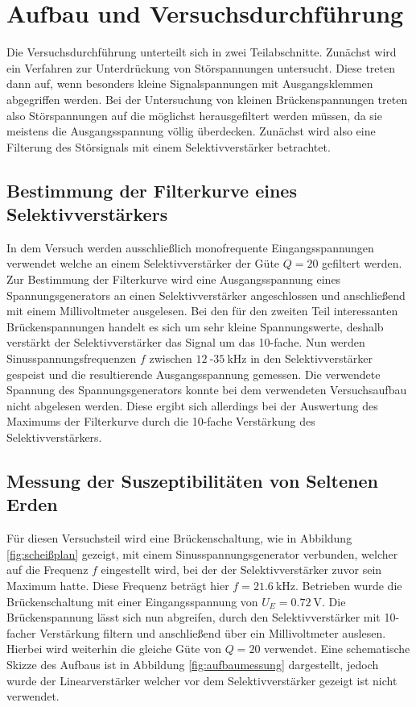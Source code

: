 \section{Aufbau und Versuchsdurchführung}

Die Versuchsdurchführung unterteilt sich in zwei Teilabschnitte. Zunächst wird ein Verfahren zur Unterdrückung von Störspannungen untersucht. Diese treten dann auf, wenn besonders kleine Signalspannungen mit Ausgangsklemmen abgegriffen werden.
Bei der Untersuchung von kleinen Brückenspannungen treten also Störspannungen auf die möglichst herausgefiltert werden müssen, da sie meistens die Ausgangsspannung völlig überdecken. Zunächst wird also eine Filterung des Störsignals mit
einem Selektivverstärker betrachtet.

\subsection{Bestimmung der Filterkurve eines Selektivverstärkers}
In dem Versuch werden ausschließlich monofrequente Eingangsspannungen verwendet welche an einem Selektivverstärker der Güte $Q = 20$ gefiltert werden. Zur Bestimmung der Filterkurve wird eine Ausgangsspannung eines Spannungsgenerators 
an einen Selektivverstärker angeschlossen und anschließend mit einem Millivoltmeter ausgelesen. 
Bei den für den zweiten Teil interessanten Brückenspannungen handelt es sich um sehr kleine Spannungswerte, deshalb verstärkt der Selektivverstärker das Signal um das 10-fache.
Nun werden Sinusspannungsfrequenzen $f$ zwischen $\SI{12}{}$-$\SI{35}{\kilo\hertz}$ in den Selektivverstärker gespeist und die resultierende Ausgangsspannung gemessen.
Die verwendete Spannung des Spannungsgenerators konnte bei dem verwendeten Versuchsaufbau nicht abgelesen werden. Diese ergibt sich allerdings bei der Auswertung des Maximums der Filterkurve durch die 10-fache Verstärkung des Selektivverstärkers.

\subsection{Messung der Suszeptibilitäten von Seltenen Erden} 
Für diesen Versuchsteil wird eine Brückenschaltung, wie in Abbildung \ref{fig:scheißplan} gezeigt, mit einem Sinusspannungsgenerator verbunden, welcher auf die Frequenz $f$ eingestellt wird, bei der der Selektivverstärker zuvor sein Maximum hatte. Diese Frequenz beträgt hier $f = \SI{21.6}{\kilo\hertz}$.
Betrieben wurde die Brückenschaltung mit einer Eingangsspannung von $U_{E} = \SI{0.72}{\volt}$. Die Brückenspannung lässt sich nun abgreifen, durch den Selektivverstärker mit 10-facher Verstärkung filtern und anschließend über ein Millivoltmeter auslesen. Hierbei wird weiterhin die gleiche Güte von $Q = 20$ verwendet.
Eine schematische Skizze des Aufbaus ist in Abbildung \ref{fig:aufbaumessung} dargestellt, jedoch wurde der Linearverstärker welcher vor dem Selektivverstärker gezeigt ist nicht verwendet.

